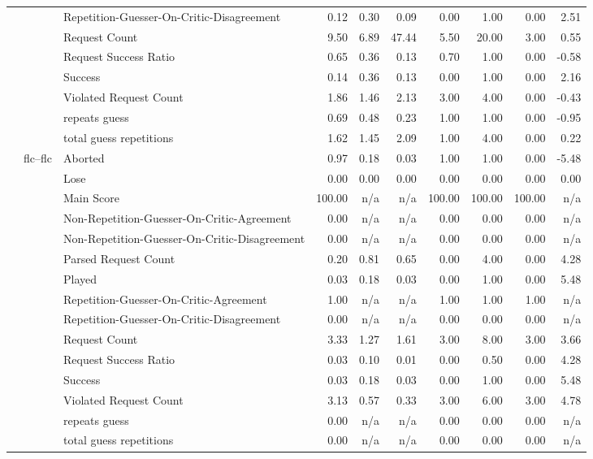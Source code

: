 \begin{tabular}{lllrrrrrrr}
 &  & Repetition-Guesser-On-Critic-Disagreement & 0.12 & 0.30 & 0.09 & 0.00 & 1.00 & 0.00 & 2.51 \\
 &  & Request Count & 9.50 & 6.89 & 47.44 & 5.50 & 20.00 & 3.00 & 0.55 \\
 &  & Request Success Ratio & 0.65 & 0.36 & 0.13 & 0.70 & 1.00 & 0.00 & -0.58 \\
 &  & Success & 0.14 & 0.36 & 0.13 & 0.00 & 1.00 & 0.00 & 2.16 \\
 &  & Violated Request Count & 1.86 & 1.46 & 2.13 & 3.00 & 4.00 & 0.00 & -0.43 \\
 &  & repeats guess & 0.69 & 0.48 & 0.23 & 1.00 & 1.00 & 0.00 & -0.95 \\
 &  & total guess repetitions & 1.62 & 1.45 & 2.09 & 1.00 & 4.00 & 0.00 & 0.22 \\
\cline{2-10}
 & \multirow[t]{15}{*}{flc--flc} & Aborted & 0.97 & 0.18 & 0.03 & 1.00 & 1.00 & 0.00 & -5.48 \\
 &  & Lose & 0.00 & 0.00 & 0.00 & 0.00 & 0.00 & 0.00 & 0.00 \\
 &  & Main Score & 100.00 & n/a & n/a & 100.00 & 100.00 & 100.00 & n/a \\
 &  & Non-Repetition-Guesser-On-Critic-Agreement & 0.00 & n/a & n/a & 0.00 & 0.00 & 0.00 & n/a \\
 &  & Non-Repetition-Guesser-On-Critic-Disagreement & 0.00 & n/a & n/a & 0.00 & 0.00 & 0.00 & n/a \\
 &  & Parsed Request Count & 0.20 & 0.81 & 0.65 & 0.00 & 4.00 & 0.00 & 4.28 \\
 &  & Played & 0.03 & 0.18 & 0.03 & 0.00 & 1.00 & 0.00 & 5.48 \\
 &  & Repetition-Guesser-On-Critic-Agreement & 1.00 & n/a & n/a & 1.00 & 1.00 & 1.00 & n/a \\
 &  & Repetition-Guesser-On-Critic-Disagreement & 0.00 & n/a & n/a & 0.00 & 0.00 & 0.00 & n/a \\
 &  & Request Count & 3.33 & 1.27 & 1.61 & 3.00 & 8.00 & 3.00 & 3.66 \\
 &  & Request Success Ratio & 0.03 & 0.10 & 0.01 & 0.00 & 0.50 & 0.00 & 4.28 \\
 &  & Success & 0.03 & 0.18 & 0.03 & 0.00 & 1.00 & 0.00 & 5.48 \\
 &  & Violated Request Count & 3.13 & 0.57 & 0.33 & 3.00 & 6.00 & 3.00 & 4.78 \\
 &  & repeats guess & 0.00 & n/a & n/a & 0.00 & 0.00 & 0.00 & n/a \\
 &  & total guess repetitions & 0.00 & n/a & n/a & 0.00 & 0.00 & 0.00 & n/a \\

\end{tabular}
